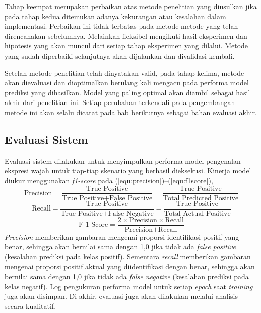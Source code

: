 Tahap keempat merupakan perbaikan atas metode penelitian yang diusulkan jika pada tahap kedua ditemukan adanya kekurangan atau kesalahan dalam implementasi. Perbaikan ini tidak terbatas pada metode-metode yang telah direncanakan sebelumnya. Melainkan fleksibel mengikuti hasil eksperimen dan hipotesis yang akan muncul dari setiap tahap eksperimen yang dilalui. Metode yang sudah diperbaiki selanjutnya akan dijalankan dan divalidasi kembali.

Setelah metode penelitian telah dinyatakan valid, pada tahap kelima, metode akan dievaluasi dan dioptimalkan berulang kali mengacu pada performa model prediksi yang dihasilkan. Model yang paling optimal akan diambil sebagai hasil akhir dari penelitian ini. Setiap perubahan terkendali pada pengembangan metode ini akan selalu dicatat pada bab berikutnya sebagai bahan evaluasi akhir.

\subsection{Evaluasi Sistem}
Evaluasi sistem dilakukan untuk menyimpulkan performa model pengenalan ekspresi wajah untuk tiap-tiap skenario yang berhasil dieksekusi. Kinerja model diukur menggunakan \textit{f1-score}  pada (\ref{equ:precision})--(\ref{equ:f1score}),
\small
\begin{equation}
    \text{Precision} = \frac{\text{True Positive}}{\text{True Positive}+\text{False Positive}} = \frac{\text{True Positive}}{\text{Total Predicted Positive}}
    \label{equ:precision}
\end{equation}
\begin{equation}
    \text{Recall} = \frac{\text{True Positive}}{\text{True Positive}+\text{False Negative}} = \frac{\text{True Positive}}{\text{Total Actual Positive}}
    \label{equ:recall}
\end{equation}
\begin{equation}
    \text{F-1 Score} = \frac{2\times\text{Precision}\times\text{Recall}}{\text{Precision}+\text{Recall}}
    \label{equ:f1score}
\end{equation}
\normalsize
\textit{Precision} memberikan gambaran mengenai proporsi identifikasi positif yang benar, sehingga akan bernilai sama dengan 1,0 jika tidak ada \textit{false positive} (kesalahan prediksi pada kelas positif). Sementara \textit{recall} memberikan gambaran mengenai proporsi positif aktual yang diidentifikasi dengan benar, sehingga akan bernilai sama dengan 1,0 jika tidak ada \textit{false negative} (kesalahan prediksi pada kelas negatif). Log pengukuran performa model untuk setiap \textit{epoch} saat \textit{training} juga akan disimpan. Di akhir, evaluasi juga akan dilakukan melalui analisis secara kualitatif.

